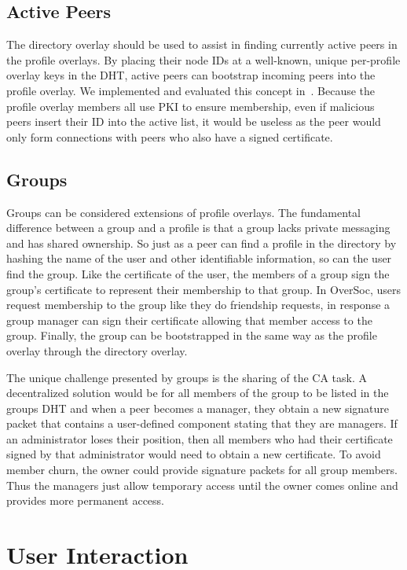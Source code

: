 \documentclass{sig-alternate}
\begin{document}
\subsection{Active Peers}

The directory overlay should be used to assist in finding currently active
peers in the profile overlays.  By placing their node IDs at a well-known,
unique per-profile overlay keys in the DHT, active peers can bootstrap
incoming peers into the profile overlay.  We implemented and evaluated this
concept in~\cite{vpo}.  Because the profile overlay members all use PKI to
ensure membership, even if malicious peers insert their ID into the active
list, it would be useless as the peer would only form connections with peers
who also have a signed certificate.

\subsection{Groups}

Groups can be considered extensions of profile overlays.  The fundamental
difference between a group and a profile is that a group lacks private
messaging and has shared ownership.  So just as a peer can find a profile in
the directory by hashing the name of the user and other identifiable
information, so can the user find the group.  Like the certificate of the user,
the members of a group sign the group's certificate to represent their
membership to that group.  In OverSoc, users request membership to the group
like they do friendship requests, in response a group manager can sign their
certificate allowing that member access to the group.  Finally, the group can
be bootstrapped in the same way as the profile overlay through the directory
overlay.

The unique challenge presented by groups is the sharing of the CA task.  A
decentralized solution would be for all members of the group to be listed in
the groups DHT and when a peer becomes a manager, they obtain a new signature
packet that contains a user-defined component stating that they are managers.
If an administrator loses their position, then all members who had their
certificate signed by that administrator would need to obtain a new
certificate.  To avoid member churn, the owner could provide signature packets
for all group members.  Thus the managers just allow temporary access until the
owner comes online and provides more permanent access.

\section{User Interaction}
\label{user_interaction}
\end{document}
